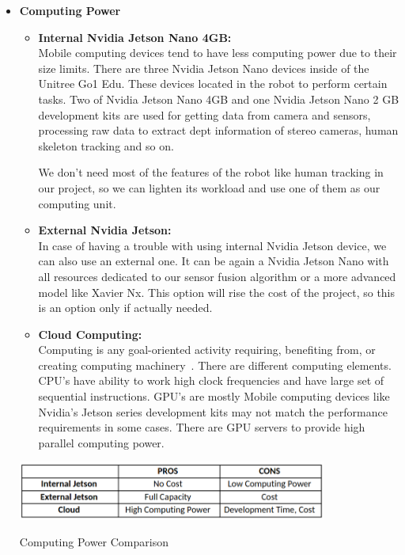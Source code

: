 \documentclass[12pt]{article}
\begin{document}
\begin{itemize}
    \item \textbf{Computing Power}
          \begin{itemize}
              \item \textbf{Internal Nvidia Jetson Nano 4GB:} \\
                    Mobile computing devices tend to have less computing power due to their size limits. There are three Nvidia Jetson Nano devices inside of the Unitree Go1 Edu. These devices located in the robot to perform certain tasks. Two of Nvidia Jetson Nano 4GB and one Nvidia Jetson Nano 2 GB development kits are used for getting data from camera and sensors, processing raw data to extract dept information of stereo cameras, human skeleton tracking and so on. 
                    
                    We don’t need most of the features of the robot like human tracking in our project, so we can lighten its workload and use one of them as our computing unit. 
                    
              \item \textbf{External Nvidia Jetson:} \\
                    In case of having a trouble with using internal Nvidia Jetson device, we can also use an external one. It can be again a Nvidia Jetson Nano with all resources dedicated to our sensor fusion algorithm or a more advanced model like Xavier Nx. This option will rise the cost of the project, so this is an option only if actually needed. 
                    
              \item \textbf{Cloud Computing:} \\
                    Computing is any goal-oriented activity requiring, benefiting from, or creating computing machinery~\cite{enwiki:1120224488}. There are different computing elements. CPU’s have ability to work high clock frequencies and have large set of sequential instructions. GPU’s are mostly  Mobile computing devices like Nvidia’s Jetson series development kits may not match the performance requirements in some cases. There are GPU servers to provide high parallel computing power.
                    
          \end{itemize}
          
          \vspace{10pt}
          
          \begin{table}[H]
              \centering
              \includegraphics[width=0.8\textwidth]{ComputerComparison.png}
              \caption{Computing Power Comparison}
          \end{table}
          

\end{itemize}
\end{document}
